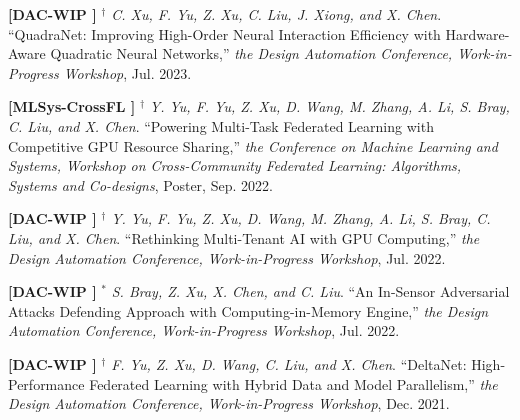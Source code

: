 			\vspace{3mm}








	\textbf{[DAC-WIP ]}
	$^\dagger$
	\textsl{C. Xu, F. Yu, Z. Xu, C. Liu, J. Xiong, and X. Chen}.
		``QuadraNet: Improving High-Order Neural Interaction Efficiency with Hardware-Aware Quadratic Neural Networks,''
		\textsl{the Design Automation Conference, Work-in-Progress Workshop}, Jul. 2023.
			\vspace{-3mm}

	\textbf{[MLSys-CrossFL ]}
	$^\dagger$
	\textsl{Y. Yu, F. Yu, Z. Xu, D. Wang, M. Zhang, A. Li, S. Bray, C. Liu, and X. Chen}.
		``Powering Multi-Task Federated Learning with Competitive GPU Resource Sharing,''
		\textsl{the Conference on Machine Learning and Systems, Workshop on Cross-Community Federated Learning: Algorithms, Systems and Co-designs}, Poster, Sep. 2022.
			\vspace{-4mm}
			\vspace{-3mm}

	\textbf{[DAC-WIP ]}
	$^\dagger$
	\textsl{Y. Yu, F. Yu, Z. Xu, D. Wang, M. Zhang, A. Li, S. Bray, C. Liu, and X. Chen}.
		``Rethinking Multi-Tenant AI with GPU Computing,''
		\textsl{the Design Automation Conference, Work-in-Progress Workshop}, Jul. 2022.
			\vspace{-3mm}

	\textbf{[DAC-WIP ]}
	$^\ast$
	\textsl{S. Bray, Z. Xu, X. Chen, and C. Liu}.
		``An In-Sensor Adversarial Attacks Defending Approach with Computing-in-Memory Engine,''
		\textsl{the Design Automation Conference, Work-in-Progress Workshop}, Jul. 2022.
			\vspace{-3mm}

	\textbf{[DAC-WIP ]}
	$^\dagger$
	\textsl{F. Yu, Z. Xu, D. Wang, C. Liu, and X. Chen}.
		``DeltaNet: High-Performance Federated Learning with Hybrid Data and Model Parallelism,''
		\textsl{the Design Automation Conference, Work-in-Progress Workshop}, Dec. 2021.
			\vspace{-3mm}

